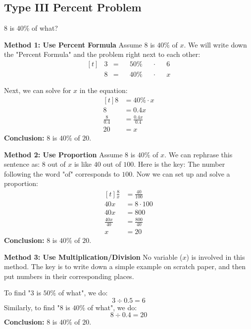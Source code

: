 \subsection{Type III Percent Problem}
\begin{myexample}
$8$ is $40\%$ of what?
\end{myexample}
\begin{solution}

\textbf{Method 1: Use Percent Formula} Assume $8$ is $40\%$ of $x$. We will write down the "Percent Formula" and the problem right next to each other:
\[
\begin{aligned}[t]
	&3 &= &&50\% &&\cdot &&6 \\
	&8 &= &&40\% &&\cdot &&x
\end{aligned}
\]

Next, we can solve for $x$ in the equation:
\[
\begin{aligned}[t]
	8 &= 40\% \cdot x \\
	8 &= 0.4x \\
	\frac{8}{0.4} &= \frac{0.4x}{0.4} \\
	20 &= x
\end{aligned}
\]
\textbf{Conclusion:} $8$ is $40\%$ of $20$.

\textbf{Method 2: Use Proportion}  Assume $8$ is $40\%$ of $x$. We can rephrase this sentence as: $8$ out of $x$ is like $40$ out of $100$. Here is the key: The number following the word "of" corresponds to $100$. Now we can set up and solve a proportion:
\[
\begin{aligned}[t]
	\frac{8}{x} &= \frac{40}{100} \\
	40x &= 8 \cdot 100 \\
	40x &= 800 \\
	\frac{40x}{40} &= \frac{800}{40} \\
	x &= 20
\end{aligned}
\]
\textbf{Conclusion:} $8$ is $40\%$ of $20$.

\textbf{Method 3: Use Multiplication/Division} No variable ($x$) is involved in this method. The key is to write down a simple example on scratch paper, and then put numbers in their corresponding places.

To find "$3$ is $50\%$ of what", we do:
\[ 3\div0.5=6 \]
Similarly, to find "$8$ is $40\%$ of what", we do:
\[ 8\div0.4=20 \]
\textbf{Conclusion:} $8$ is $40\%$ of $20$.

\end{solution}

